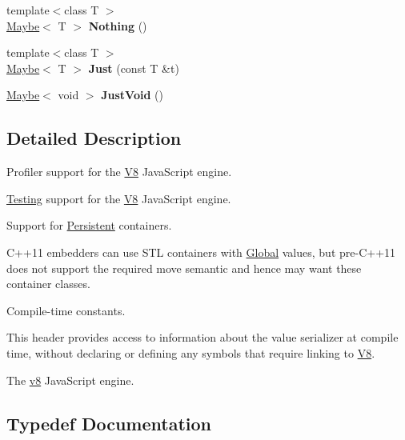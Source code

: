 \begin{DoxyCompactItemize}
\item 
\mbox{\label{namespacev8_ac44d2f17c448576d57576035c8032c46}} 
{\footnotesize template$<$class T $>$ }\\\mbox{\hyperlink{classv8_1_1Maybe}{Maybe}}$<$ T $>$ {\bfseries Nothing} ()
\item 
\mbox{\label{namespacev8_a41f0e280eadfba6ac9afd833fdd540cf}} 
{\footnotesize template$<$class T $>$ }\\\mbox{\hyperlink{classv8_1_1Maybe}{Maybe}}$<$ T $>$ {\bfseries Just} (const T \&t)
\item 
\mbox{\label{namespacev8_ae627b8226ed9d00dae40672fd0d6e57d}} 
\mbox{\hyperlink{classv8_1_1Maybe}{Maybe}}$<$ void $>$ {\bfseries Just\+Void} ()
\end{DoxyCompactItemize}


\subsection{Detailed Description}
Profiler support for the \mbox{\hyperlink{classv8_1_1V8}{V8}} Java\+Script engine.

\mbox{\hyperlink{classv8_1_1Testing}{Testing}} support for the \mbox{\hyperlink{classv8_1_1V8}{V8}} Java\+Script engine.

Support for \mbox{\hyperlink{classv8_1_1Persistent}{Persistent}} containers.

C++11 embedders can use S\+TL containers with \mbox{\hyperlink{classv8_1_1Global}{Global}} values, but pre-\/\+C++11 does not support the required move semantic and hence may want these container classes.

Compile-\/time constants.

This header provides access to information about the value serializer at compile time, without declaring or defining any symbols that require linking to \mbox{\hyperlink{classv8_1_1V8}{V8}}.

The \mbox{\hyperlink{namespacev8}{v8}} Java\+Script engine. 

\subsection{Typedef Documentation}
\mbox{\label{namespacev8_a1024fb358d107c1494163217830688e6}} 

